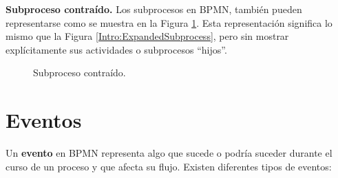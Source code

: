 {\bf Subproceso contraído.} Los subprocesos en BPMN, también pueden representarse como se muestra en la Figura \ref{Intro:CollapsedSubprocess}. Esta representación significa lo mismo que la Figura \ref{Intro:ExpandedSubprocess}, pero sin mostrar explícitamente sus actividades o subprocesos ``hijos''.
	\begin{figure}[!h]
	\centering{}%
	\caption{Subproceso contraído.}
	\label{Intro:CollapsedSubprocess}
	\end{figure}



\section{Eventos}

Un {\bf evento} en BPMN representa algo que sucede o podría suceder durante el curso de un proceso y que afecta su flujo. Existen diferentes tipos de eventos:

